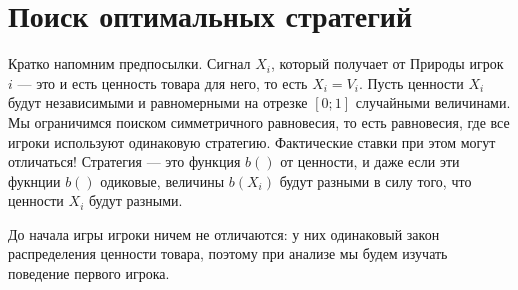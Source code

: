 \section{Поиск оптимальных стратегий}

Кратко напомним предпосылки. Сигнал $ X_{i} $, который получает от Природы игрок $ i $ — это и есть ценность товара для него, то есть $ X_{i}=V_{i} $. Пусть ценности $ X_{i} $ будут независимыми и равномерными на отрезке $ [0;1] $ случайными величинами. Мы ограничимся поиском симметричного равновесия, то есть равновесия, где все игроки используют одинаковую стратегию. Фактические ставки при этом могут отличаться! Стратегия — это функция $b()$ от ценности, и даже если эти фукнции $ b() $ одиковые, величины $ b(X_{i}) $ будут разными в силу того, что ценности $ X_{i} $ будут разными.


До начала игры игроки ничем не отличаются: у них одинаковый закон распределения ценности товара, поэтому при анализе мы будем изучать поведение первого игрока.

